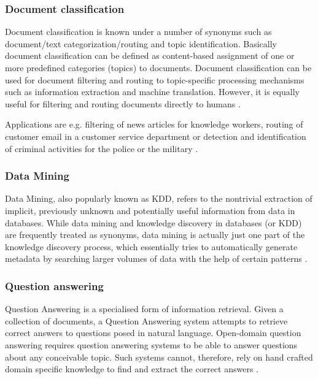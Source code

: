 \subsubsection{Document classification}
Document classification is known under a number of synonyms such as document/text categorization/routing and topic identification. Basically document classification can be defined as content-based assignment of one or more predefined categories (topics) to documents. Document classification can be used for document filtering and routing to topic-specific processing mechanisms such as information extraction and machine translation. However, it is equally useful for filtering and routing documents directly to humans \cite{Knorz:2000}.

Applications are e.g. filtering of news articles for knowledge workers, routing of customer email in a customer service department or detection and identification of criminal activities for the police or the military \cite{Knorz:2000}.

\subsubsection{Data Mining}
Data Mining, also popularly known as \gls{KDD}, refers to the nontrivial extraction of implicit, previously unknown and potentially useful information from data in databases. While data mining and knowledge discovery in databases (or KDD) are frequently treated as synonyms, data mining is actually just one part of the knowledge discovery process, which essentially tries to automatically generate metadata by searching larger volumes of data with the help of certain patterns \cite{Zaiane:1999}. 

\subsubsection{Question answering}
Question Answering is a specialised form of information retrieval. Given a collection of documents, a Question Answering system attempts to retrieve correct answers to questions posed in natural language. Open-domain question answering requires question answering systems to be able to answer questions about any conceivable topic. Such systems cannot, therefore, rely on hand crafted domain specific knowledge to find and extract the correct answers \cite{Lampert:2004}.
